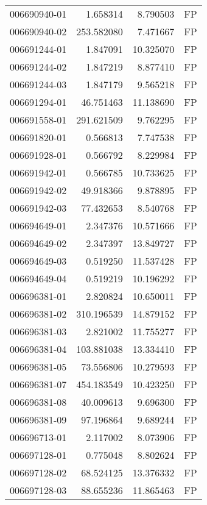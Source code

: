 \begin{tabular}{lrrl}
006690940-01 &    1.658314 &       8.790503 &   FP \\
006690940-02 &  253.582080 &       7.471667 &   FP \\
006691244-01 &    1.847091 &      10.325070 &   FP \\
006691244-02 &    1.847219 &       8.877410 &   FP \\
006691244-03 &    1.847179 &       9.565218 &   FP \\
006691294-01 &   46.751463 &      11.138690 &   FP \\
006691558-01 &  291.621509 &       9.762295 &   FP \\
006691820-01 &    0.566813 &       7.747538 &   FP \\
006691928-01 &    0.566792 &       8.229984 &   FP \\
006691942-01 &    0.566785 &      10.733625 &   FP \\
006691942-02 &   49.918366 &       9.878895 &   FP \\
006691942-03 &   77.432653 &       8.540768 &   FP \\
006694649-01 &    2.347376 &      10.571666 &   FP \\
006694649-02 &    2.347397 &      13.849727 &   FP \\
006694649-03 &    0.519250 &      11.537428 &   FP \\
006694649-04 &    0.519219 &      10.196292 &   FP \\
006696381-01 &    2.820824 &      10.650011 &   FP \\
006696381-02 &  310.196539 &      14.879152 &   FP \\
006696381-03 &    2.821002 &      11.755277 &   FP \\
006696381-04 &  103.881038 &      13.334410 &   FP \\
006696381-05 &   73.556806 &      10.279593 &   FP \\
006696381-07 &  454.183549 &      10.423250 &   FP \\
006696381-08 &   40.009613 &       9.696300 &   FP \\
006696381-09 &   97.196864 &       9.689244 &   FP \\
006696713-01 &    2.117002 &       8.073906 &   FP \\
006697128-01 &    0.775048 &       8.802624 &   FP \\
006697128-02 &   68.524125 &      13.376332 &   FP \\
006697128-03 &   88.655236 &      11.865463 &   FP \\

\end{tabular}

